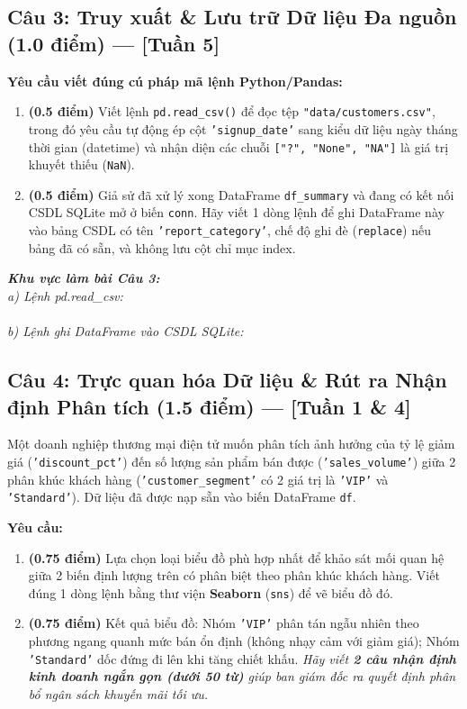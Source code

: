 \documentclass[11pt,a4paper]{article}
\newcommand{\answerbox}[2]{
  \vspace{1mm}
  \begin{tcolorbox}[
    colback=white,
    colframe=gray!60,
    boxrule=0.6pt,
    arc=2pt,
    height=#1,
    left=3mm, right=3mm, top=2mm, bottom=2mm
  ]
  \small\textit{\color{gray}#2}
  \end{tcolorbox}
  \vspace{1mm}
}
\begin{document}
\newpage
\subsection*{Câu 3: Truy xuất \& Lưu trữ Dữ liệu Đa nguồn (1.0 điểm) --- [Tuần 5]}
\noindent
\textbf{Yêu cầu viết đúng cú pháp mã lệnh Python/Pandas:}
\begin{enumerate}[label=\textbf{\alph*)}]
  \item \textbf{(0.5 điểm)} Viết lệnh \texttt{pd.read\_csv()} để đọc tệp \texttt{"data/customers.csv"}, trong đó yêu cầu tự động ép cột \texttt{'signup\_date'} sang kiểu dữ liệu ngày tháng thời gian (datetime) và nhận diện các chuỗi \texttt{["?", "None", "NA"]} là giá trị khuyết thiếu (\texttt{NaN}).
  \item \textbf{(0.5 điểm)} Giả sử đã xử lý xong DataFrame \texttt{df\_summary} và đang có kết nối CSDL SQLite mở ở biến \texttt{conn}. Hãy viết 1 dòng lệnh để ghi DataFrame này vào bảng CSDL có tên \texttt{'report\_category'}, chế độ ghi đè (\texttt{replace}) nếu bảng đã có sẵn, và không lưu cột chỉ mục index.
\end{enumerate}

\answerbox{3.8cm}{
\textbf{Khu vực làm bài Câu 3:}\\
a) Lệnh pd.read\_csv: \dotfill\\[2.5mm]
\hspace*{3.5cm}\dotfill\\[2.5mm]
b) Lệnh ghi DataFrame vào CSDL SQLite: \dotfill
}

\subsection*{Câu 4: Trực quan hóa Dữ liệu \& Rút ra Nhận định Phân tích (1.5 điểm) --- [Tuần 1 \& 4]}
Một doanh nghiệp thương mại điện tử muốn phân tích ảnh hưởng của tỷ lệ giảm giá (\texttt{'discount\_pct'}) đến số lượng sản phẩm bán được (\texttt{'sales\_volume'}) giữa 2 phân khúc khách hàng (\texttt{'customer\_segment'} có 2 giá trị là \texttt{'VIP'} và \texttt{'Standard'}). Dữ liệu đã được nạp sẵn vào biến DataFrame \texttt{df}.

\noindent
\textbf{Yêu cầu:}
\begin{enumerate}[label=\textbf{\alph*)}]
  \item \textbf{(0.75 điểm)} Lựa chọn loại biểu đồ phù hợp nhất để khảo sát mối quan hệ giữa 2 biến định lượng trên có phân biệt theo phân khúc khách hàng. Viết đúng 1 dòng lệnh bằng thư viện \textbf{Seaborn} (\texttt{sns}) để vẽ biểu đồ đó.
  \item \textbf{(0.75 điểm)} Kết quả biểu đồ: Nhóm \texttt{'VIP'} phân tán ngẫu nhiên theo phương ngang quanh mức bán ổn định (không nhạy cảm với giảm giá); Nhóm \texttt{'Standard'} dốc đứng đi lên khi tăng chiết khấu.  
  \textit{Hãy viết \textbf{2 câu nhận định kinh doanh ngắn gọn (dưới 50 từ)} giúp ban giám đốc ra quyết định phân bổ ngân sách khuyến mãi tối ưu.}
\end{enumerate}
\end{document}
